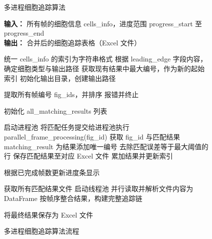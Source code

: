 \begin{figure}[htbp]
    \centering
    \begin{algorithm}[H]
        \caption{多进程细胞追踪算法}
        \label{alg:cell_tracking}

        \textbf{输入：} 所有帧的细胞信息 cells\_info，进度范围 progress\_start 至 progress\_end \\
        \textbf{输出：} 合并后的细胞追踪表格（Excel 文件）

        \begin{algorithmic}[1]
            \STATE 统一 cells\_info 的索引为字符串格式
            \STATE 根据 leading\_edge 字段内容，确定细胞类型与输出路径
                \STATE 获取现有结果中最大编号，作为新的起始索引
            \ENDIF
            \STATE 初始化输出目录，创建输出路径

            \STATE 提取所有帧编号 fig\_ids，并排序
                \STATE 报错并终止
            \ENDIF

            \STATE 初始化 all\_matching\_results 列表

            \STATE 启动进程池
                \STATE 将匹配任务提交给进程池执行 parallel\_frame\_processing(fig\_id)
            \ENDFOR
                \STATE 获取 fig\_id 与匹配结果 matching\_result
                \STATE 为结果添加唯一编号
                \STATE 去除匹配误差等于最大阈值的行
                \STATE 保存匹配结果至对应 Excel 文件
                \STATE 累加结果并更新索引
            \ENDFOR

                \STATE 根据已完成帧数更新进度条显示
            \ENDFOR

            \STATE 获取所有匹配结果文件
            \STATE 启动线程池
                \STATE 并行读取并解析文件内容为 DataFrame
            \ENDFOR
            \STATE 按帧序整合结果，构建完整追踪链

            \STATE 将最终结果保存为 Excel 文件
        \end{algorithmic}
    \end{algorithm}
    \caption{多进程细胞追踪算法流程}\label{fig:flowchart_tracking}
\end{figure}
